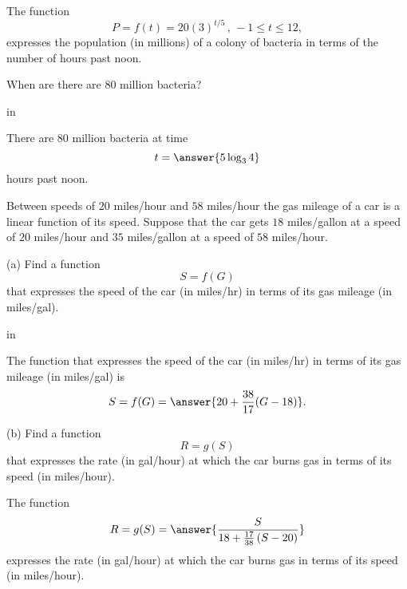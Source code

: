 \documentclass{ximera}
\newcommand{\pskip}{\vskip 0.1 in}
\begin{document}
\begin{question}
The function
\[
  P = f(t) = 20 (3)^{t/5} \, , \, -1 \leq t \leq 12 ,
\]
expresses the population (in millions) of a colony of bacteria in terms of the number of hours past noon. 

When are there are 80 million bacteria?

\pskip

There are 80 million bacteria at time
\[
 t = \answer{5 \log_3 4}
\]
hours past noon.
\end{question}


\begin{question}  \label{Q99834322}
Between speeds of $20$ miles/hour and $58$ miles/hour the gas mileage of a car is a linear function of its speed. Suppose that the car gets $18$ miles/gallon at a speed of $20$ miles/hour and $35$ miles/gallon at a speed of $58$ miles/hour.

(a) Find a function 
\[
       S = f(G)
\]
that expresses the speed of the car (in miles/hr) in terms of its gas mileage (in miles/gal).

\pskip

The function that expresses the speed of the car (in miles/hr) in terms of its gas mileage (in miles/gal) is
\[
      S = f(G) = \answer{20 + \frac{38}{17}(G-18)} .
\]

(b) Find a function 
\[
   R = g(S)
\]
that expresses the rate (in gal/hour) at which the car burns gas in terms of its speed (in miles/hour).

The function
\[
        R = g(S) = \answer{\frac{S}{18+\frac{17}{38}\left(  S - 20  \right)}}
\]
expresses the rate (in gal/hour) at which the car burns gas in terms of its speed (in miles/hour).
\end{question}
\end{document}
